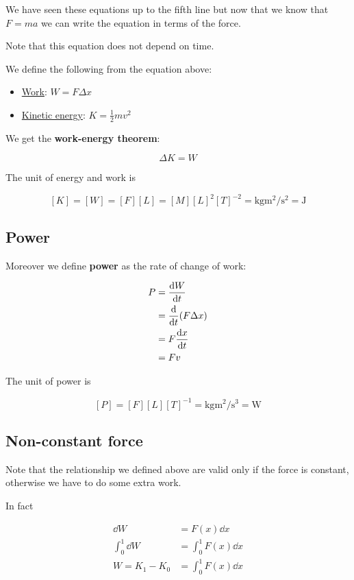 \documentclass[10pt]{extarticle}
\begin{document}
We have seen these equations up to the fifth line but now that we know that $F = m a$ we can write the equation in terms of the force.

Note that this equation does not depend on time.

We define the following from the equation above:

\begin{itemize}
  \item \underline{Work}: $W = F \Delta x$
  \item \underline{Kinetic energy}: $K = \frac{1}{2} m v^2$
\end{itemize}

We get the \textbf{work-energy theorem}:

$$
  \Delta K = W
$$

The unit of energy and work is

$$
  [K] = [W] = [F][L] = [M][L]^2[T]^{-2} = \si{\kilogram \meter \squared \per \second \squared} = \si{\joule}
$$

\subsection{Power}

Moreover we define \textbf{power} as the rate of change of work:

\begin{align*}
  P & = \dv{W}{t}           \\
    & = \dv{t} (F \Delta x) \\
    & = F \dv{x}{t}         \\
    & = F v
\end{align*}


The unit of power is

$$
  [P] = [F][L][T]^{-1} = \si{\kilogram \meter \squared \per \second \cubed} = \si{\watt}
$$

\subsection{Non-constant force}

Note that the relationship we defined above are valid only if the force is constant, otherwise we have to do some extra work.

In fact

\begin{align*}
  \dd{W}          & = F(x) \dd{x}          \\
  \int_0^1 \dd{W} & = \int_0^1 F(x) \dd{x} \\
  W = K_1 - K_0   & = \int_0^1 F(x) \dd{x}
\end{align*}
\end{document}
